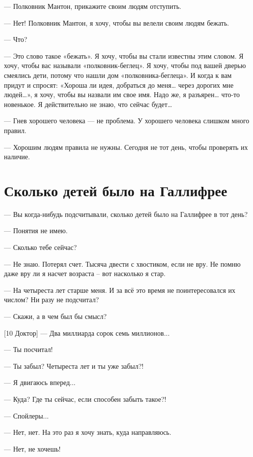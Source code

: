 \documentclass{bmstu}
\begin{document}
— Полковник Мантон, прикажите своим людям отступить.

— Нет! Полковник Мантон, я хочу, чтобы вы велели своим людям бежать.

— Что?

— Это слово такое «бежать». Я хочу, чтобы вы стали известны этим словом. Я хочу,
чтобы вас называли «полковник-беглец». Я хочу, чтобы под вашей дверью смеялись
дети, потому что нашли дом «полковника-беглеца». И когда к вам придут и спросят:
«Хороша ли идея, добраться до меня… через дорогих мне людей…», я хочу, чтобы вы
назвали им свое имя. Надо же, я разъярен… что-то новенькое. Я действительно не
знаю, что сейчас будет…

— Гнев хорошего человека — не проблема. У хорошего человека слишком много
правил.

— Хорошим людям правила не нужны. Сегодня не тот день, чтобы проверять их
наличие.

\section*{Сколько детей было на Галлифрее}

— Вы когда-нибудь подсчитывали, сколько детей было на Галлифрее в тот день?

— Понятия не имею.

— Сколько тебе сейчас?

— Не знаю. Потерял счет. Тысяча двести с хвостиком, если не вру. Не помню даже
вру ли я насчет возраста – вот насколько я стар.

— На четыреста лет старше меня. И за всё это время не поинтересовался их числом?
Ни разу не подсчитал?

— Скажи, а в чем был бы смысл?

[10 Доктор] — Два миллиарда сорок семь миллионов...

— Ты посчитал!

— Ты забыл? Четыреста лет и ты уже забыл?!

— Я двигаюсь вперед...

— Куда? Где ты сейчас, если способен забыть такое?!

— Спойлеры...

— Нет, нет. На это раз я хочу знать, куда направляюсь.

— Нет, не хочешь!
\end{document}
